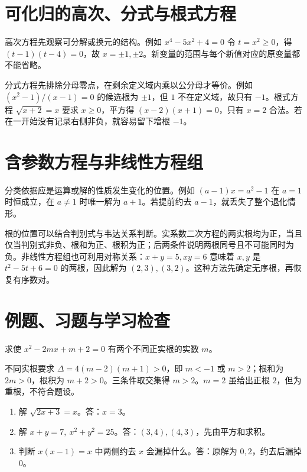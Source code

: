 \section{可化归的高次、分式与根式方程}
高次方程先观察可分解或换元的结构。例如 $x^4-5x^2+4=0$ 令 $t=x^2\ge0$，得 $(t-1)(t-4)=0$，故 $x=\pm1,\pm2$。新变量的范围与每个新值对应的原变量都不能省略。

分式方程先排除分母零点，在剩余定义域内乘以公分母才等价。例如 $(x^2-1)/(x-1)=0$ 的候选根为 $\pm1$，但 $1$ 不在定义域，故只有 $-1$。根式方程 $\sqrt{x+2}=x$ 要求 $x\ge0$，平方得 $(x-2)(x+1)=0$，只有 $x=2$ 合法。若在一开始没有记录右侧非负，就容易留下增根 $-1$。

\section{含参数方程与非线性方程组}
分类依据应是运算或解的性质发生变化的位置。例如 $(a-1)x=a^2-1$ 在 $a=1$ 时恒成立，在 $a\ne1$ 时唯一解为 $a+1$。若提前约去 $a-1$，就丢失了整个退化情形。

根的位置可以结合判别式与韦达关系判断。实系数二次方程的两实根均为正，当且仅当判别式非负、根和为正、根积为正；后两条件说明两根同号且不可能同时为负。非线性方程组也可利用对称关系：$x+y=5,xy=6$ 意味着 $x,y$ 是 $t^2-5t+6=0$ 的两根，因此解为 $(2,3),(3,2)$。这种方法先确定无序根，再恢复有序数对。

\section{例题、习题与学习检查}
\begin{example}
求使 $x^2-2mx+m+2=0$ 有两个不同正实根的实数 $m$。
\end{example}
\begin{solve}
不同实根要求 $\Delta=4(m-2)(m+1)>0$，即 $m<-1$ 或 $m>2$；根和为 $2m>0$，根积为 $m+2>0$。三条件取交集得 $m>2$。$m=2$ 虽给出正根 $2$，但为重根，不符合题设。
\end{solve}
\begin{enumerate}
\item 解 $\sqrt{2x+3}=x$。答：$x=3$。
\item 解 $x+y=7,\ x^2+y^2=25$。答：$(3,4),(4,3)$，先由平方和求积。
\item 判断 $x(x-1)=x$ 中两侧约去 $x$ 会漏掉什么。答：原解为 $0,2$，约去后漏掉 $0$。
\end{enumerate}

